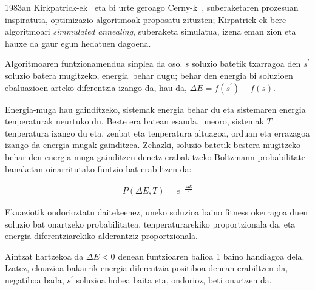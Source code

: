 \documentclass[eu]{ifirak}\usepackage[]{graphicx}\usepackage[]{color}
\newcommand{\zkk}{\guillemotleft}
\newcommand{\skk}{\guillemotright}
\begin{document}
1983an Kirkpatrick-ek~\cite{kirkpatrick1983} eta bi urte geroago Cerny-k~\cite{cerny1985}, suberaketaren prozesuan inspiratuta, optimizazio algoritmoak proposatu zituzten; Kirpatrick-ek bere algoritmoari \textit{simmulated annealing}, suberaketa simulatua, izena eman zion eta hauxe da gaur egun hedatuen dagoena.

Algoritmoaren funtzionamendua sinplea da oso. $s$ soluzio batetik txarragoa den $s^\prime$ soluzio batera mugitzeko, \zkk energia\skk\ behar dugu; behar den energia bi soluzioen ebaluazioen arteko diferentzia izango da, hau da, $\Delta E = f(s^\prime) - f(s)$. 

Energia-muga hau gainditzeko, sistemak energia behar du eta sistemaren energia \zkk tenperatura\skk k neurtuko du. Beste era batean esanda, uneoro, sistemak $T$ tenperatura izango du eta, zenbat eta tenperatura altuagoa, orduan eta errazagoa izango da energia-mugak gainditzea. Zehazki, soluzio batetik bestera mugitzeko behar den energia-muga gainditzen denetz erabakitzeko Boltzmann probabilitate-banaketan oinarritutako funtzio bat erabiltzen da:

\begin{align*}
P(\Delta E, T) = e^{-\frac{\Delta E}{T}}
\end{align*}

Ekuaziotik ondorioztatu daitekeenez, uneko soluzioa baino fitness okerragoa duen soluzio bat onartzeko probabilitatea, tenperaturarekiko proportzionala da, eta energia diferentziarekiko alderantziz proportzionala.

Aintzat hartzekoa da $\Delta E<0$ denean funtzioaren balioa 1 baino handiagoa dela. Izatez, ekuazioa bakarrik energia diferentzia positiboa denean erabiltzen da, negatiboa bada, $s^\prime$ soluzioa hobea baita eta, ondorioz, beti onartzen da.
\end{document}
